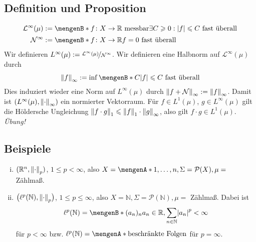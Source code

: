 \subsection[Definition und Proposition: Der normierte Raum $L^\infty(\mu)$ und ]{Definition und Proposition} %
\label{sub:48}
\begin{align*}
	\mathcal{L}^\infty(\mu) &:= \set[f \colon X \to \mathds{R} \text{ messbar}]{\exists C \ge 0 : \abs*{f} \le C \text{ fast überall} \rule{0cm}{0.7em}\rule{0cm}{0.9em}}  \\
	\mathcal{N}^\infty &:= \set[f \colon X \to \mathds{R}]{f=0 \text{ fast überall}\rule{0cm}{0.9em}} 
\end{align*}
Wir definieren $L^\infty(\mu) := \nicefrac{\mathcal{L}^\infty(\mu)}{\mathcal{N}^\infty}$. Wir definieren eine Halbnorm auf $\mathcal{L}^\infty(\mu)$ durch
\[
	\norm[\infty]{f} := \inf \set[C]{\abs*{f} \le C \text{ fast überall}\rule{0cm}{0.9em}}
\]
Dies induziert wieder eine Norm auf $L^\infty(\mu)$ durch $\norm[\infty]{f + \mathcal{N}} := \norm[\infty]{f}$. Damit ist $\enbrace*{L^\infty(\mu), \norm[\infty]{\cdot}}$
ein normierter Vektorraum. Für $f \in L^1(\mu)$, $g \in L^\infty(\mu)$ gilt die Höldersche Ungleichung $\norm[1]{f \cdot g} \le \norm[1]{f} \cdot \norm[\infty]{g}$, also gilt
$f \cdot g \in L^1(\mu)$.
\emph{Übung!} \bewende

\subsection[Beispiele für $L^p$-Räume]{Beispiele} %
\label{sub:49}
\begin{enumerate}[(i)]
	\item $(\mathds{R}^n, \norm[p]{\cdot})$, $1 \le p < \infty$, also $X=\set{1,\ldots,n}, \Sigma=\mathcal{P}(X), \mu =$ Zählmaß.
	\item $\enbrace[\big]{\ell^p(\mathds{N}), \norm[p]{\cdot }}$, $1 \le p \le \infty$, also $X=\mathds{N}, \Sigma=\mathcal{P}(\mathds{N}), \mu=$ Zählmaß.
	Dabei ist 
	\[
		\ell^p(\mathds{N}) = \set[(a_n)_n]{a_n \in \mathds{R}, \sum_{n \in \mathds{N}} \abs*{a_n}^p < \infty} 
	\]
	für $p < \infty$ bzw. $\ell^p(\mathds{N})= \set{\text{beschränkte Folgen}}$ für $p=\infty$.
\end{enumerate}

